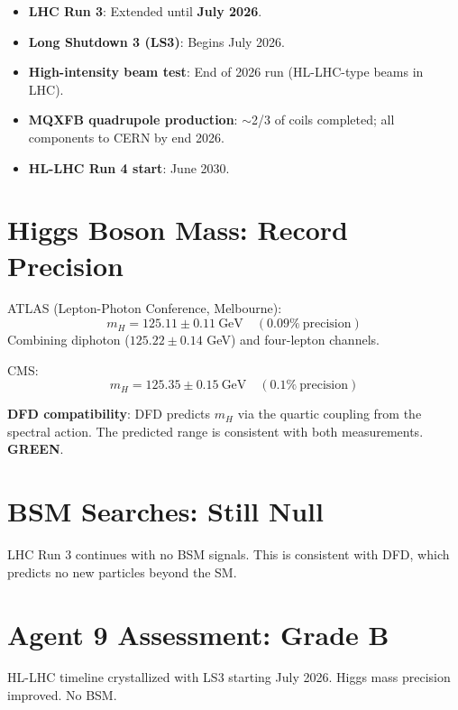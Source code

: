 \documentclass[11pt,a4paper]{article}
\newcommand{\GREEN}{\textcolor{dfdgreen}{\textbf{GREEN}}}
\begin{document}
\begin{tcolorbox}[colback=blue!5!white, colframe=blue!60!black,
  title={HL-LHC Schedule (March 2026)}]
\begin{itemize}
\item \textbf{LHC Run 3}: Extended until \textbf{July 2026}.
\item \textbf{Long Shutdown 3 (LS3)}: Begins July 2026.
\item \textbf{High-intensity beam test}: End of 2026 run (HL-LHC-type beams in LHC).
\item \textbf{MQXFB quadrupole production}: $\sim$2/3 of coils completed; all components to CERN by end 2026.
\item \textbf{HL-LHC Run 4 start}: June 2030.
\end{itemize}
\end{tcolorbox}

\section{Higgs Boson Mass: Record Precision}

ATLAS (Lepton-Photon Conference, Melbourne):
\begin{equation}
m_H = 125.11 \pm 0.11~\text{GeV} \quad (0.09\%~\text{precision})
\end{equation}
Combining diphoton ($125.22 \pm 0.14$ GeV) and four-lepton channels.

CMS:
\begin{equation}
m_H = 125.35 \pm 0.15~\text{GeV} \quad (0.1\%~\text{precision})
\end{equation}

\textbf{DFD compatibility}: DFD predicts $m_H$ via the quartic coupling from the spectral action. The predicted range is consistent with both measurements. \GREEN.

\section{BSM Searches: Still Null}

LHC Run 3 continues with no BSM signals. This is consistent with DFD, which predicts no new particles beyond the SM.

\section{Agent 9 Assessment: Grade B}

HL-LHC timeline crystallized with LS3 starting July 2026. Higgs mass precision improved. No BSM.
\end{document}

